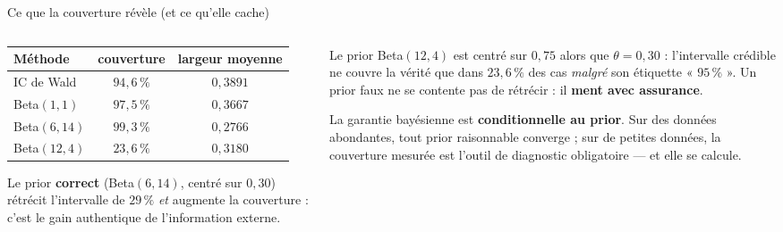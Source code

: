 \begin{frame}{Ce que la couverture révèle (et ce qu'elle cache)}
\begin{columns}[t]
\begin{column}{0.49\textwidth}
\begin{ebox}
\begin{tabular}{@{}lcc@{}}
\toprule
Méthode & couverture & largeur moyenne \\
\midrule
IC de Wald & $94{,}6\,\%$ & $0{,}3891$ \\
Beta$(1,1)$ & $97{,}5\,\%$ & $0{,}3667$ \\
Beta$(6,14)$ & $99{,}3\,\%$ & $0{,}2766$ \\
Beta$(12,4)$ & $23{,}6\,\%$ & $0{,}3180$ \\
\bottomrule
\end{tabular}
\vspace{1.5mm}

\small Le prior \textbf{correct} (Beta$(6,14)$, centré sur $0{,}30$) rétrécit
l'intervalle de $29\,\%$ \emph{et} augmente la couverture : c'est le gain
authentique de l'information externe.
\end{ebox}
\end{column}
\begin{column}{0.49\textwidth}
\begin{wbox}
Le prior Beta$(12,4)$ est centré sur $0{,}75$ alors que $\theta = 0{,}30$ :
l'intervalle crédible ne couvre la vérité que dans $23{,}6\,\%$ des cas
\emph{malgré} son étiquette « $95\,\%$ ». Un prior faux ne se contente pas de
rétrécir : il \textbf{ment avec assurance}.
\end{wbox}
\begin{kbox}[La règle d'or]
La garantie bayésienne est \textbf{conditionnelle au prior}. Sur des données
abondantes, tout prior raisonnable converge ; sur de petites données, la
couverture mesurée est l'outil de diagnostic obligatoire --- et elle se calcule.
\end{kbox}
\end{column}
\end{columns}
\end{frame}

